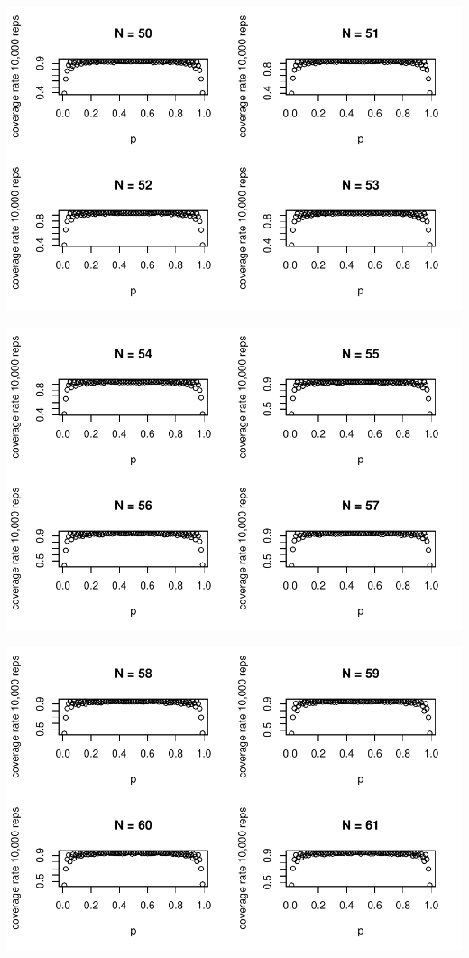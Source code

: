 \documentclass{article}\usepackage[]{graphicx}\usepackage[]{color}
\makeatletter
\def\maxwidth{ %
  \ifdim\Gin@nat@width>\linewidth
    \linewidth
  \else
    \Gin@nat@width
  \fi
}
\newenvironment{knitrout}{}{} %
\makeatother
\begin{document}
\begin{enumerate}
\begin{knitrout}
{}




{\centering \includegraphics[width=\maxwidth]{figure/prob1_final-2} 

}




{\centering \includegraphics[width=\maxwidth]{figure/prob1_final-3} 

}




{\centering \includegraphics[width=\maxwidth]{figure/prob1_final-4} 

}
\end{knitrout}
\end{enumerate}
\end{document}
